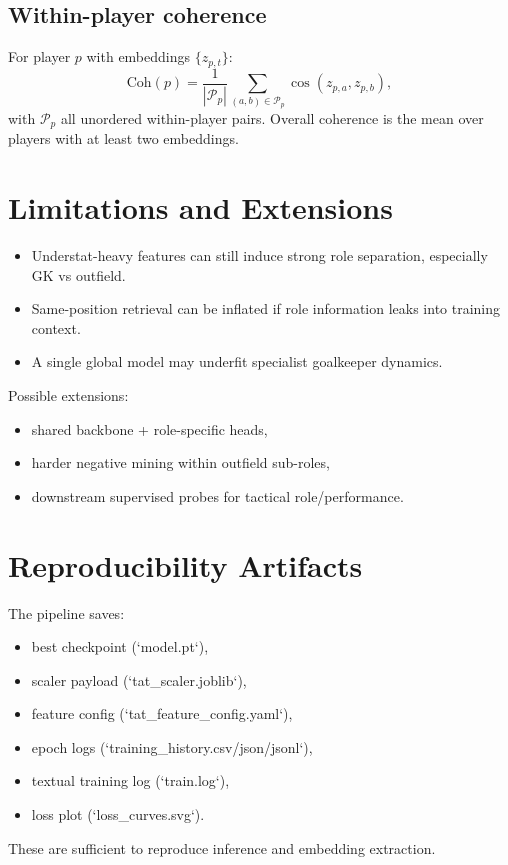 \documentclass[11pt]{article}
\begin{document}
\subsection{Within-player coherence}
For player $p$ with embeddings $\{z_{p,t}\}$:
\begin{equation}
\text{Coh}(p)=\frac{1}{|\mathcal{P}_p|}\sum_{(a,b)\in\mathcal{P}_p}\cos(z_{p,a},z_{p,b}),
\end{equation}
with $\mathcal{P}_p$ all unordered within-player pairs. Overall coherence is the mean over players with at least two embeddings.

\section{Limitations and Extensions}

\begin{itemize}
  \item Understat-heavy features can still induce strong role separation, especially GK vs outfield.
  \item Same-position retrieval can be inflated if role information leaks into training context.
  \item A single global model may underfit specialist goalkeeper dynamics.
\end{itemize}

Possible extensions:
\begin{itemize}
  \item shared backbone + role-specific heads,
  \item harder negative mining within outfield sub-roles,
  \item downstream supervised probes for tactical role/performance.
\end{itemize}

\section{Reproducibility Artifacts}

The pipeline saves:
\begin{itemize}
  \item best checkpoint (`model.pt`),
  \item scaler payload (`tat\_scaler.joblib`),
  \item feature config (`tat\_feature\_config.yaml`),
  \item epoch logs (`training\_history.csv/json/jsonl`),
  \item textual training log (`train.log`),
  \item loss plot (`loss\_curves.svg`).
\end{itemize}

These are sufficient to reproduce inference and embedding extraction.
\end{document}
